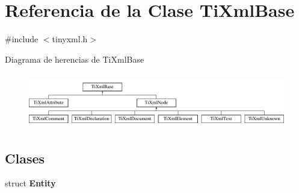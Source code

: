 \hypertarget{classTiXmlBase}{\section{\-Referencia de la \-Clase \-Ti\-Xml\-Base}
\label{classTiXmlBase}
}


{\ttfamily \#include $<$tinyxml.\-h$>$}

\-Diagrama de herencias de \-Ti\-Xml\-Base\begin{figure}[H]
\begin{center}
\leavevmode
\includegraphics[height=2.413793cm]{classTiXmlBase}
\end{center}
\end{figure}
\subsection*{\-Clases}
\begin{DoxyCompactItemize}
\item 
struct {\bfseries \-Entity}
\end{DoxyCompactItemize}
